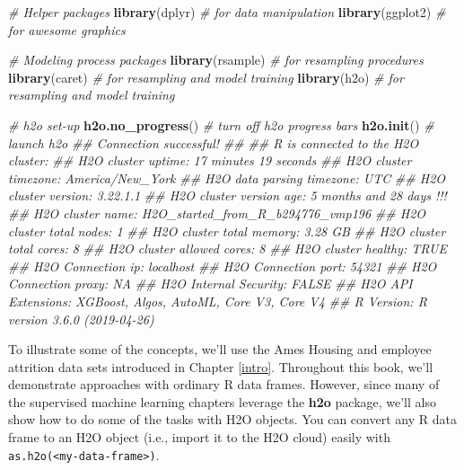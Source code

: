 \documentclass[]{krantz}
\makeatletter
\newenvironment{Shaded}{\begin{snugshade}}{\end{snugshade}}
\newcommand{\CommentTok}[1]{\textcolor[rgb]{0.37,0.37,0.37}{\textit{#1}}}
\newcommand{\KeywordTok}[1]{\textcolor[rgb]{0.27,0.27,0.27}{\textbf{#1}}}
\newcommand{\NormalTok}[1]{#1}
\newenvironment{kframe}{%
\medskip{}
\setlength{\fboxsep}{.8em}
 \def\at@end@of@kframe{}%
 \ifinner\ifhmode%
  \def\at@end@of@kframe{\end{minipage}}%
  \begin{minipage}{\columnwidth}%
 \fi\fi%
 \def\FrameCommand##1{\hskip\@totalleftmargin \hskip-\fboxsep
 \colorbox{shadecolor}{##1}\hskip-\fboxsep
     \hskip-\linewidth \hskip-\@totalleftmargin \hskip\columnwidth}%
 \MakeFramed {\advance\hsize-\width
   \@totalleftmargin\z@ \linewidth\hsize
   \@setminipage}}%
 {\par\unskip\endMakeFramed%
 \at@end@of@kframe}
\renewenvironment{Shaded}{\begin{kframe}}{\end{kframe}}
\makeatother
\begin{document}
\begin{Shaded}
\begin{Highlighting}[]
\CommentTok{# Helper packages}
\KeywordTok{library}\NormalTok{(dplyr)     }\CommentTok{# for data manipulation}
\KeywordTok{library}\NormalTok{(ggplot2)   }\CommentTok{# for awesome graphics}

\CommentTok{# Modeling process packages}
\KeywordTok{library}\NormalTok{(rsample)   }\CommentTok{# for resampling procedures}
\KeywordTok{library}\NormalTok{(caret)     }\CommentTok{# for resampling and model training}
\KeywordTok{library}\NormalTok{(h2o)       }\CommentTok{# for resampling and model training}

\CommentTok{# h2o set-up }
\KeywordTok{h2o.no_progress}\NormalTok{()  }\CommentTok{# turn off h2o progress bars}
\KeywordTok{h2o.init}\NormalTok{()         }\CommentTok{# launch h2o}
\CommentTok{##  Connection successful!}
\CommentTok{## }
\CommentTok{## R is connected to the H2O cluster: }
\CommentTok{##     H2O cluster uptime:         17 minutes 19 seconds }
\CommentTok{##     H2O cluster timezone:       America/New_York }
\CommentTok{##     H2O data parsing timezone:  UTC }
\CommentTok{##     H2O cluster version:        3.22.1.1 }
\CommentTok{##     H2O cluster version age:    5 months and 28 days !!! }
\CommentTok{##     H2O cluster name:           H2O_started_from_R_b294776_vmp196 }
\CommentTok{##     H2O cluster total nodes:    1 }
\CommentTok{##     H2O cluster total memory:   3.28 GB }
\CommentTok{##     H2O cluster total cores:    8 }
\CommentTok{##     H2O cluster allowed cores:  8 }
\CommentTok{##     H2O cluster healthy:        TRUE }
\CommentTok{##     H2O Connection ip:          localhost }
\CommentTok{##     H2O Connection port:        54321 }
\CommentTok{##     H2O Connection proxy:       NA }
\CommentTok{##     H2O Internal Security:      FALSE }
\CommentTok{##     H2O API Extensions:         XGBoost, Algos, AutoML, Core V3, Core V4 }
\CommentTok{##     R Version:                  R version 3.6.0 (2019-04-26)}
\end{Highlighting}
\end{Shaded}

To illustrate some of the concepts, we'll use the Ames Housing and employee attrition data sets introduced in Chapter \ref{intro}. Throughout this book, we'll demonstrate approaches with ordinary R data frames. However, since many of the supervised machine learning chapters leverage the \textbf{h2o} package, we'll also show how to do some of the tasks with H2O objects. You can convert any R data frame to an H2O object (i.e., import it to the H2O cloud) easily with \texttt{as.h2o(\textless{}my-data-frame\textgreater{})}.
\end{document}
